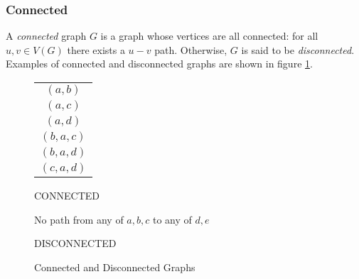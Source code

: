\subsubsection{Connected}\label{sec:sub:sub:connected}

A \emph{connected} graph \(G\) is a graph whose vertices are all connected: for all \(u,v\in V(G)\) there exists a
\(u-v\) path.  Otherwise, \(G\) is said to be \emph{disconnected}.  Examples of connected and disconnected graphs
are shown in figure \ref{fig:connect}.

\begin{figure}[H]
  \label{fig:connect}
  \begin{minipage}[t]{2.5in}
    \begin{center}

      \bigskip

      \begin{tabular}{c}
        \((a,b)\) \\
        \((a,c)\) \\
        \((a,d)\) \\
        \((b,a,c)\) \\
        \((b,a,d)\) \\
        \((c,a,d)\)
      \end{tabular}

      \bigskip
      
      CONNECTED
    \end{center}
  \end{minipage}
  \begin{minipage}[t]{3in}
    \begin{center}

      \bigskip
      
      No path from any of \(a,b,c\) to any of \(d,e\)

      \bigskip

      DISCONNECTED
    \end{center}
  \end{minipage}
  \caption{Connected and Disconnected Graphs}
\end{figure}

